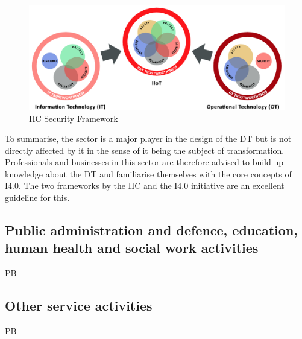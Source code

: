 \begin{figure}[H]
\centering
\includegraphics[width=1\columnwidth]{images/iic-iiot-trustworthiness}
\caption{\ac{IIC} Security Framework}
\end{figure}

To summarise, the sector is a major player in the design of the \ac{DT} but is not directly affected by it in the sense of it being the subject of transformation. Professionals and businesses in this sector are therefore advised to build up knowledge about the \ac{DT} and familiarise themselves with the core concepts of \ac{I4.0}. The two frameworks by the \ac{IIC} and the \ac{I4.0} initiative are an excellent guideline for this. 

\subsection{Public administration and defence, education, human health and social work activities}
PB

\subsection{Other service activities}
PB